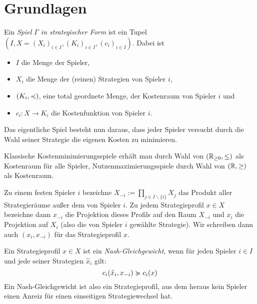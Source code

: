 \section{Grundlagen}\label{sec:Grundlagen}

\begin{defn}
	Ein \emph{Spiel $\Gamma$ in strategischer Form} ist ein Tupel $(I, X = (X_i)_{i \in I}, (K_i)_{i\in I}, (c_i)_{i\in I})$. Dabei ist
	\begin{itemize}
		\item $I$ die Menge der Spieler,
		\item $X_i$ die Menge der (reinen) Strategien von Spieler $i$,
		\item $(K_i, \preccurlyeq)$, eine total geordnete Menge, der Kostenraum von Spieler $i$ und
		\item $c_i: X \to K_i$ die Kostenfunktion von Spieler $i$.
	\end{itemize}
	Das eigentliche Spiel besteht nun daraus, dass jeder Spieler versucht durch die Wahl seiner Strategie die eigenen Kosten zu minimieren.
\end{defn}

\begin{beob}
	Klassische Kostenminimierungsspiele erhält man durch Wahl von $(\mathbb{R}_{\geq 0}, \leq)$ als Kostenraum für alle Spieler, Nutzenmaximierungsspiele durch Wahl von $(\mathbb{R}, \geq)$ als \glqq Kosten\grqq raum.
\end{beob}

\begin{notation}
	Zu einem festen Spieler $i$ bezeichne $X_{-i} := \prod_{j \in I\backslash\{i\}} X_j$ das Produkt aller Strategieräume außer dem von Spieler $i$. Zu jedem Strategieprofil $x \in X$ bezeichne dann $x_{-i}$ die Projektion dieses Profils auf den Raum $X_{-i}$ und $x_i$ die Projektion auf $X_i$ (also die von Spieler $i$ gewählte Strategie). Wir schreiben dann auch $(x_i, x_{-i})$ für das Strategieprofil $x$.
\end{notation}

\begin{defn}
	Ein Strategieprofil $x \in X$ ist ein \emph{Nash-Gleichgewicht}, wenn für jeden Spieler $i \in I$ und jede seiner Strategien $\hat{x}_i$ gilt:
		\[c_i(\hat{x}_i, x_{-i}) \succcurlyeq c_i(x)\]
	Ein Nash-Gleichgewicht ist also ein Strategieprofil, aus dem heraus kein Spieler einen Anreiz für einen einseitigen Strategiewechsel hat.	
\end{defn}

